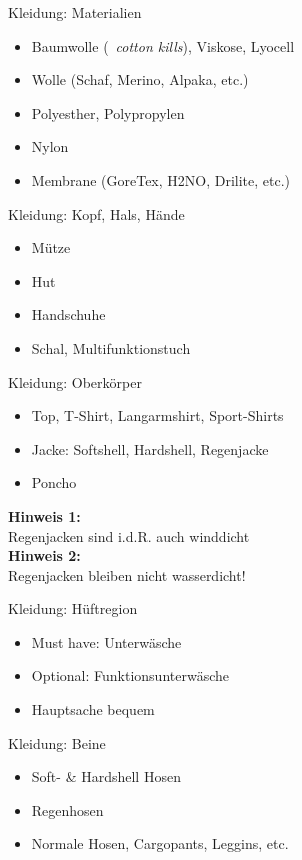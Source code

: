 \documentclass{beamer}
\newcommand{\tipp}[2][Tipp:]{\vspace{0.2cm}\textbf{#1:}\\#2}
\begin{document}
			\begin{frame}{Kleidung: Materialien}
				\begin{itemize}
					\item Baumwolle (\textrightarrow\ \textit{cotton kills}), Viskose, Lyocell
					\item Wolle (Schaf, Merino, Alpaka, etc.)
					\item Polyesther, Polypropylen
					\item Nylon
					\item Membrane (GoreTex, H2NO, Drilite, etc.)
				\end{itemize}
			\end{frame}
			
			\begin{frame}{Kleidung: Kopf, Hals, Hände}
				\begin{itemize}
					\item Mütze
					\item Hut
					\item Handschuhe
					\item Schal, Multifunktionstuch
				\end{itemize}
			\end{frame}
			
			\begin{frame}{Kleidung: Oberkörper}
				\begin{itemize}
					\item Top, T-Shirt, Langarmshirt, Sport-Shirts
					\item Jacke: Softshell, Hardshell, Regenjacke
					\item Poncho
				\end{itemize}\pause
				\tipp[Hinweis 1]{Regenjacken sind i.d.R. auch winddicht}\\\pause
				\tipp[Hinweis 2]{Regenjacken bleiben nicht wasserdicht!}
			\end{frame}
			
			\begin{frame}{Kleidung: Hüftregion}
				\begin{itemize}
					\item Must have: Unterwäsche
					\item Optional: Funktionsunterwäsche
					\item Hauptsache bequem
				\end{itemize}
			\end{frame}
			
			\begin{frame}{Kleidung: Beine}
				\begin{itemize}
					\item Soft- \& Hardshell Hosen
					\item Regenhosen
					\item Normale Hosen, Cargopants, Leggins, etc.
				\end{itemize}
			\end{frame}
			
\end{document}
